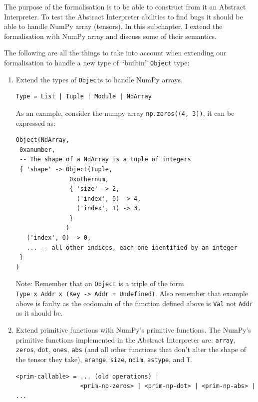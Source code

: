\documentclass[
11pt, %
english, %
singlespacing, %
headsepline, %
]{MastersDoctoralThesis} %
\begin{document}
The purpose of the formalisation is to be able to construct from it an
Abstract Interpreter. To test the Abstract Interpreter abilities to find
bugs it should be able to handle NumPy array (tensors). In this
subchapter, I extend the formalisation with NumPy array and discuss some
of their semantics.

The following are all the things to take into account when extending our
formalisation to handle a new type of \enquote{builtin} \texttt{Object}
type:

\begin{enumerate}
\def\labelenumi{\arabic{enumi}.}
\item
  Extend the types of \texttt{Object}s to handle NumPy arrays.

\begin{verbatim}
Type = List | Tuple | Module | NdArray
\end{verbatim}

  As an example, consider the numpy array \texttt{np.zeros((4,\ 3))}, it
  can be expressed as:

\begin{verbatim}
Object(NdArray,
 0xanumber,
 -- The shape of a NdArray is a tuple of integers
 { 'shape' -> Object(Tuple,
               0xothernum,
               { 'size' -> 2,
                 ('index', 0) -> 4,
                 ('index', 1) -> 3,
               }
              )
   ('index', 0) -> 0,
   ... -- all other indices, each one identified by an integer
 }
)
\end{verbatim}

  Note: Remember that an \texttt{Object} is a triple of the form
  \texttt{Type\ x\ Addr\ x\ (Key\ -\textgreater{}\ Addr\ +\ Undefined)}.
  Also remember that example above is faulty as the codomain of the
  function defined above is \texttt{Val} not \texttt{Addr} as it should
  be.
\item
  Extend primitive functions with NumPy's primitive functions. The
  NumPy's primitive functions implemented in the Abstract Interpreter
  are: \texttt{array}, \texttt{zeros}, \texttt{dot}, \texttt{ones},
  \texttt{abs} (and all other functions that don't alter the shape of
  the tensor they take), \texttt{arange}, \texttt{size}, \texttt{ndim},
  \texttt{astype}, and \texttt{T}.

\begin{verbatim}
<prim-callable> = ... (old operations) |
                  <prim-np-zeros> | <prim-np-dot> | <prim-np-abs> | ...
\end{verbatim}


\end{enumerate}
\end{document}
